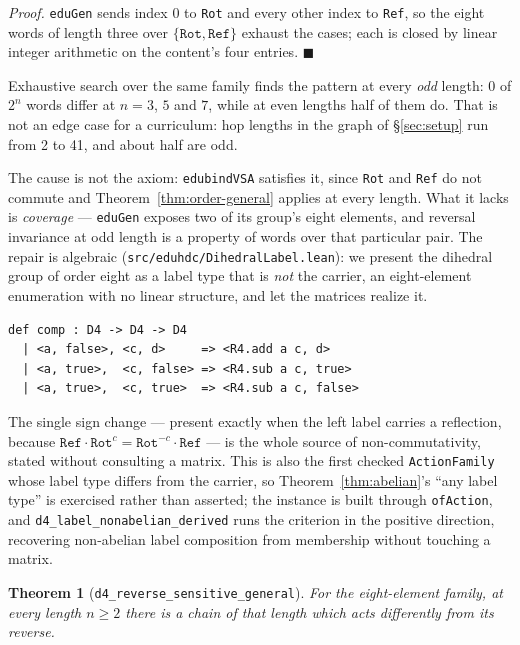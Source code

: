 \documentclass[10pt]{article}
\newtheorem{theorem}{Theorem}[section]
\begin{document}
\emph{Proof.} \texttt{eduGen} sends index $0$ to \texttt{Rot} and every other index to \texttt{Ref}, so the eight words of length three over $\{\texttt{Rot}, \texttt{Ref}\}$ exhaust the cases; each is closed by linear integer arithmetic on the content's four entries. $\blacksquare$

Exhaustive search over the same family finds the pattern at every \emph{odd} length: 0 of $2^n$ words differ at $n = 3$, $5$ and $7$, while at even lengths half of them do. That is not an edge case for a curriculum: hop lengths in the graph of \S\ref{sec:setup} run from 2 to 41, and about half are odd.

The cause is not the axiom: \texttt{edubindVSA} satisfies it, since \texttt{Rot} and \texttt{Ref} do not commute and Theorem~\ref{thm:order-general} applies at every length. What it lacks is \emph{coverage} --- \texttt{eduGen} exposes two of its group's eight elements, and reversal invariance at odd length is a property of words over that particular pair. The repair is algebraic (\texttt{src/eduhdc/\allowbreak DihedralLabel.lean}): we present the dihedral group of order eight as a label type that is \emph{not} the carrier, an eight-element enumeration with no linear structure, and let the matrices realize it.

\begin{lstlisting}
def comp : D4 -> D4 -> D4
  | <a, false>, <c, d>     => <R4.add a c, d>
  | <a, true>,  <c, false> => <R4.sub a c, true>
  | <a, true>,  <c, true>  => <R4.sub a c, false>
\end{lstlisting}

The single sign change --- present exactly when the left label carries a reflection, because $\texttt{Ref} \cdot \texttt{Rot}^c = \texttt{Rot}^{-c} \cdot \texttt{Ref}$ --- is the whole source of non-commutativity, stated without consulting a matrix. This is also the first checked \texttt{ActionFamily} whose label type differs from the carrier, so Theorem~\ref{thm:abelian}'s ``any label type'' is exercised rather than asserted; the instance is built through \texttt{ofAction}, and \texttt{d4\_label\_nonabelian\_derived} runs the criterion in the positive direction, recovering non-abelian label composition from membership without touching a matrix.

\begin{theorem}[\texttt{d4\_reverse\_sensitive\_general}]
\label{thm:d4}
For the eight-element family, at every length $n \geq 2$ there is a chain of that length which acts differently from its reverse.
\end{theorem}
\end{document}
